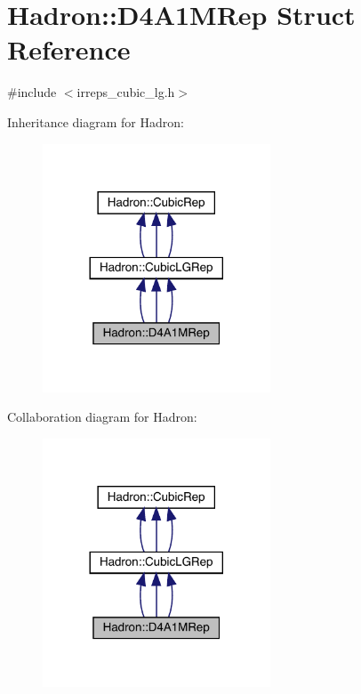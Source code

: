 \hypertarget{structHadron_1_1D4A1MRep}{}\section{Hadron\+:\+:D4\+A1\+M\+Rep Struct Reference}
\label{structHadron_1_1D4A1MRep}


{\ttfamily \#include $<$irreps\+\_\+cubic\+\_\+lg.\+h$>$}



Inheritance diagram for Hadron\+:
\nopagebreak
\begin{figure}[H]
\begin{center}
\leavevmode
\includegraphics[width=192pt]{d7/d70/structHadron_1_1D4A1MRep__inherit__graph}
\end{center}
\end{figure}


Collaboration diagram for Hadron\+:
\nopagebreak
\begin{figure}[H]
\begin{center}
\leavevmode
\includegraphics[width=192pt]{d2/d57/structHadron_1_1D4A1MRep__coll__graph}
\end{center}
\end{figure}
